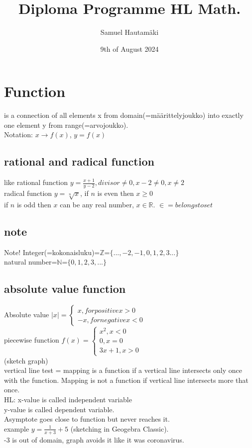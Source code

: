 \documentclass{article}
\title{Diploma Programme HL Math.}
\author{Samuel Hautamäki}
\date{9th of August 2024}
\begin{document}
  \maketitle
  
  \section{Function}
  is a connection of all elements x from domain(=määrittelyjoukko) into exactly one element y from range(=arvojoukko).\\
  Notation: $x\rightarrow f(x)$, $y=f(x)$\\
  \subsection{rational and radical function}
  like rational function $y=\frac{x+1}{y-2}, divisor \neq 0, x-2\neq0,x\neq2$\\
  radical function $y=\sqrt[n]{x}$, if $n$ is even then $x\geq0$\\
  if $n$ is odd then $x$ can be any real number, $x\in\mathbb{R}$. $\in=belongs to set$\\
   
  \subsection{note}
  Note! Integer(=kokonaisluku)=$\mathbb{Z}$=$\{...,-2,-1,0,1,2,3...\}$\\
  natural number=$\mathbb{N}$=$\{0,1,2,3,...\}$\\

  \subsection{absolute value function}
  Absolute value $|x|=\begin{cases}
    x, for positive x>0\\
    -x, for negative x<0
  \end{cases}$\\
  piecewise function $f(x)=\begin{cases}
    x^2,x<0\\
    0,x=0\\
    3x+1,x>0
  \end{cases}$\\
  (sketch graph)\\
  vertical line test = mapping is a function if a vertical line intersects only once with the function. Mapping is not a function if vertical line intersects more that once.\\
  HL: x-value is called independent variable\\
  y-value is called dependent variable.\\
  Asymptote goes close to function but never reaches it.\\
  example $y=\frac{1}{x+3}+5$ (sketching in Geogebra Classic).\\
  -3 is out of domain, graph avoids it like it was coronavirus.\\
\end{document}
